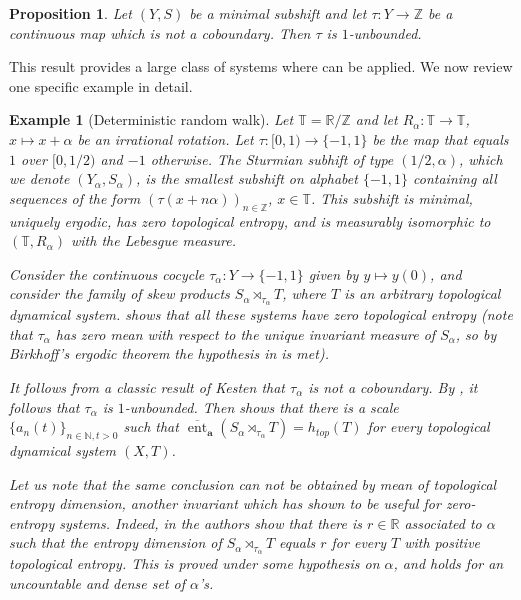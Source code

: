 \documentclass[a4paper,oneside]{amsart}
\renewcommand{\(}{\begin{dmath*}}
\renewcommand{\)}{\end{dmath*}}
\newtheorem{proposition}[theorem]{Proposition}
\newtheorem{example}[theorem]{Example}
\theoremstyle{definition}
\newcommand{\N}{\mathbb{N}}
\newcommand{\R}{\mathbb{R}}
\newcommand{\Z}{\mathbb{Z}}
\newcommand{\upperent}{\overline{\operatorname{ent}}}
\begin{document}
\begin{proposition}\label{gottschalk-non-coboundary}
    Let $(Y,S)$ be a minimal subshift and let $\tau\colon Y\to\Z$ be a continuous map which is not a coboundary. Then $\tau$ is $1$-unbounded.
\end{proposition}
This result provides a large class of systems where  can be applied. We now review one specific example in detail. 
\begin{example}[Deterministic random walk]\label{example-1}
    Let $\mathbb T=\R/\Z$ and let $R_{\alpha}\colon\mathbb T \to \mathbb T$, $x\mapsto x+\alpha$ be an irrational rotation. Let $\tau\colon [0,1)\to \{-1,1\}$ be the map that equals $1$ over $[0,1/2)$ and $-1$ otherwise. The Sturmian subhift of type $(1/2,\alpha)$, which we denote $(Y_\alpha,S_\alpha)$, is the smallest subshift on alphabet $\{-1,1\}$ containing all sequences of the form $(\tau(x+n\alpha))_{n\in\Z}$, $x\in \mathbb T$. This subshift is minimal, uniquely ergodic, has zero topological entropy, and  is measurably isomorphic to $(\mathbb{T},R_\alpha)$ with the Lebesgue measure. 
    
    Consider the continuous cocycle $\tau_{\alpha}\colon Y\to\{-1,1\}$ given by $y\mapsto y(0)$, and consider the family of skew products $S_{\alpha}\rtimes_{\tau_\alpha}T$, where $T$ is an arbitrary topological dynamical system.  shows that all these systems have zero topological entropy (note that $\tau_\alpha$ has zero mean with respect to the unique invariant measure of $S_\alpha$, so by Birkhoff's ergodic theorem the hypothesis in  is met).

    It follows from a classic result of Kesten \cite{kesten_conjecture_1966} that $\tau_\alpha$ is not a coboundary. By , it follows that $\tau_\alpha$ is $1$-unbounded. Then  shows that there is a scale $\{a_n(t)\}_{n\in\N,t>0}$ such that $\upperent_{\textbf{a}}(S_{\alpha}\rtimes_{\tau_\alpha}T)=h_{top}(T)$ for every topological dynamical system $(X,T)$. 

    Let us note that the same conclusion can not be obtained by mean of topological entropy dimension, another invariant which has shown to be useful for zero-entropy systems. Indeed, in \cite{dou_entropy_2022} the authors show that there is $r\in\R$ associated to $\alpha$ such that the entropy dimension of $S_{\alpha}\rtimes_{\tau_{\alpha}} T$ equals $r$ for every $T$ with positive topological entropy. This is proved under some hypothesis on $\alpha$, and holds for an uncountable and dense set of $\alpha$'s. 
\end{example}
\end{document}
